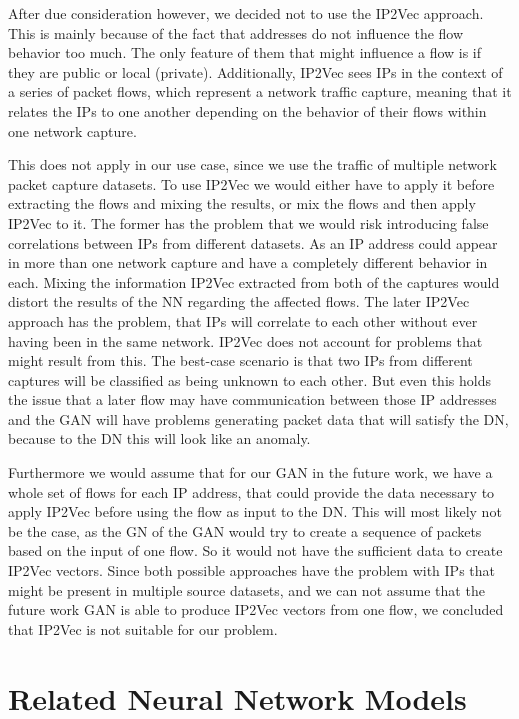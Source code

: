 \documentclass[
	ngerman,
	ruledheaders=section,%
	class=report,%
	thesis={type=bachelor},%
	accentcolor=9c,%
	custommargins=true,%
	marginpar=false,%
	parskip=half-,%
	fontsize=11pt,%
]{tudapub}
\begin{document}
After due consideration however, we decided not to use the IP2Vec approach.
This is mainly because of the fact that addresses do not influence the flow behavior too much.
The only feature of them that might influence a flow is if they are public or local (private).
Additionally, IP2Vec sees IPs in the context of a series of packet flows, which represent a network traffic capture,
meaning that it relates the IPs to one another depending on the behavior of their flows within one network capture.

This does not apply in our use case, since we use the traffic of multiple network packet capture datasets.
To use IP2Vec we would either have to apply it before extracting the flows and mixing the results,
or mix the flows and then apply IP2Vec to it.
The former has the problem that we would risk introducing false correlations between IPs from different datasets.
As an IP address could appear in more than one network capture and have a completely different behavior in each.
Mixing the information IP2Vec extracted from both of the captures would distort the results of the NN regarding the affected flows.
The later IP2Vec approach has the problem, that IPs will correlate to each other without ever having been in the same network.
IP2Vec does not account for problems that might result from this.
The best-case scenario is that two IPs from different captures will be classified as being unknown to each other.
But even this holds the issue that a later flow may have communication between those IP addresses and the GAN will have problems generating packet data that will satisfy the DN, because to the DN this will look like an anomaly.

Furthermore we would assume that for our GAN in the future work, we have a whole set of flows for each IP address, that could provide the data necessary to apply IP2Vec before using the flow as input to the DN.
This will most likely not be the case, as the GN of the GAN would try to create a sequence of packets based on the input of one flow.
So it would not have the sufficient data to create IP2Vec vectors.
Since both possible approaches have the problem with IPs that might be present in multiple source datasets,
and we can not assume that the future work GAN is able to produce IP2Vec vectors from one flow,
we concluded that IP2Vec is not suitable for our problem.

\section{Related Neural Network Models}
\label{sec:relatedNNmodels}
\end{document}
